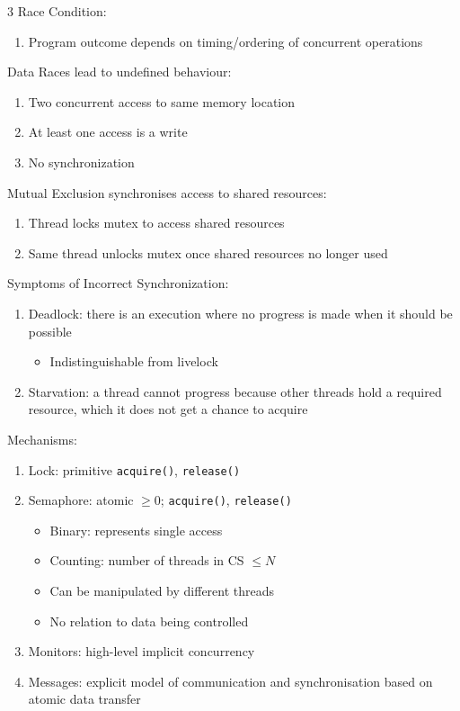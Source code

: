 \documentclass[12pt, a4paper]{article}
\begin{document}
\begin{multicols*}{3}
Race Condition:
\begin{enumerate}[\roman*.]
  \item Program outcome depends on timing/ordering of concurrent operations
\end{enumerate}

Data Races lead to undefined behaviour:
\begin{enumerate}[\roman*.]
  \item Two concurrent access to same memory location
  \item At least one access is a write
  \item No synchronization
\end{enumerate}

Mutual Exclusion synchronises access to shared resources:
\begin{enumerate}[\roman*.]
  \item Thread locks mutex to access shared resources 
  \item Same thread unlocks mutex once shared resources no longer used
\end{enumerate}

Symptoms of Incorrect Synchronization:
\begin{enumerate}[\roman*.]
  \item Deadlock: there is an execution where no progress is made when it should be possible 
    \begin{itemize}[leftmargin=*]\vspace{3pt}
      \item Indistinguishable from livelock 
    \end{itemize}
  \item Starvation: a thread cannot progress because other threads hold a required resource, which it does not get a chance to acquire
\end{enumerate}

\lstset{style=c}
Mechanisms:
\begin{enumerate}[\roman*.]
  \item Lock: primitive \lstinline|acquire()|, \lstinline|release()| 
  \item Semaphore: atomic $\geq 0$; \lstinline|acquire()|, \lstinline|release()|   
    \begin{itemize}[leftmargin=*]\vspace{3pt}
      \item Binary: represents single access 
      \item Counting: number of threads in CS $\leq N$
      \item Can be manipulated by different threads 
      \item No relation to data being controlled
    \end{itemize}
  \item Monitors: high-level implicit concurrency
  \item Messages: explicit model of communication and synchronisation based on atomic data transfer
\end{enumerate}
\vspace{-1em}
\colbreak

\end{multicols*}
\end{document}
